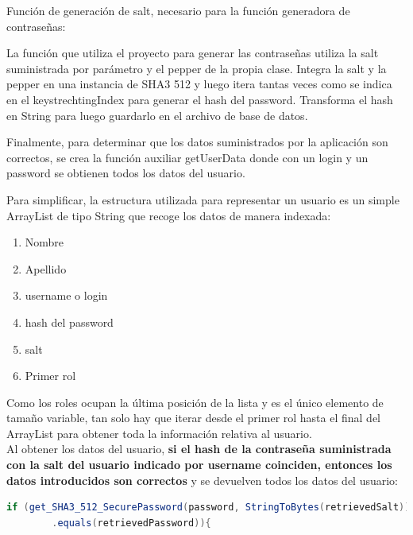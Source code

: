 \documentclass[10pt,a4paper]{article}
\begin{document}
Función de generación de salt, necesario para la función generadora de contraseñas:


La función que utiliza el proyecto para generar las contraseñas utiliza la salt suministrada por parámetro y el pepper de la propia clase. Integra la salt y la pepper en una instancia de SHA3 512 y luego itera tantas veces como se indica en el keystrechtingIndex para generar el hash del password. Transforma el hash en String para luego guardarlo en el archivo de base de datos.


Finalmente, para determinar que los datos suministrados por la aplicación son correctos, se crea la función auxiliar getUserData donde con un login y un password se obtienen todos los datos del usuario.


Para simplificar, la estructura utilizada para representar un usuario es un simple ArrayList de tipo String que recoge los datos de manera indexada:
\begin{enumerate}[start=0]
\item Nombre
\item Apellido
\item username o login
\item hash del password
\item salt
\item Primer rol
\end{enumerate}
Como los roles ocupan la última posición de la lista y es el único elemento de tamaño variable, tan solo hay que iterar desde el primer rol hasta el final del ArrayList para obtener toda la información relativa al usuario.\\
Al obtener los datos del usuario, \textbf{si el hash de la contraseña suministrada con la salt del usuario indicado por username coinciden, entonces los datos introducidos son correctos }y se devuelven todos los datos del usuario:

\begin{lstlisting}[language=java]
if (get_SHA3_512_SecurePassword(password, StringToBytes(retrievedSalt))
        .equals(retrievedPassword)){
\end{lstlisting}
\end{document}
